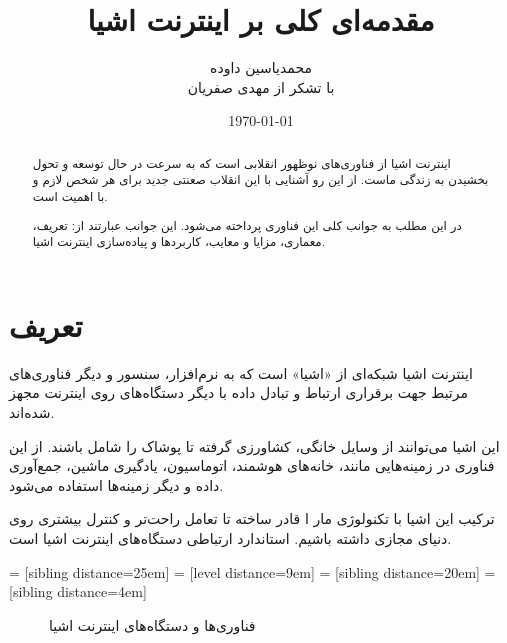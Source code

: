 \documentclass[a4paper, margin=1in]{article}
\author{محمدیاسین داوده\\
  \small{با تشکر از مهدی صفریان}}
\title{مقدمه‌ای کلی بر اینترنت اشیا}
\date{\today}
\begin{document}
\begin{titlingpage}
\maketitle

\begin{abstract}
  اینترنت اشیا از فناوری‌های نوظهور انقلابی است که به سرعت در حال توسعه و تحول بخشیدن به زندگی ماست.
  از این رو آشنایی با این انقلاب صعنتی جدید برای هر شخص لازم و با اهمیت است.

  در این مطلب به جوانب کلی این فناوری پرداخته می‌شود. این جوانب عبارتند از: تعریف، معماری، مزایا و معایب، کاربردها و پیاده‌سازی اینترنت اشیا.
\end{abstract}

\tableofcontents
\end{titlingpage}

\section{تعریف}
اینترنت اشیا شبکه‌ای از «اشیا» است که به نرم‌افزار، سنسور و دیگر فناوری‌های
مرتبط جهت برقراری ارتباط و تبادل داده با دیگر دستگاه‌های روی اینترنت مجهز شده‌اند.

این اشیا می‌توانند از وسایل خانگی، کشاورزی گرفته تا پوشاک را شامل باشند. از این فناوری در زمینه‌هایی مانند، خانه‌های هوشمند، اتوماسیون، یادگیری ماشین، جمع‌آوری داده و دیگر زمینه‌ها استفاده می‌شود.\cite{wp:iot}

ترکیب این اشیا با تکنولوژی مار ا قادر ساخته تا تعامل راحت‌تر و کنترل بیشتری روی دنیای مجازی داشته باشیم.
استاندارد ارتباطی دستگاه‌های اینترنت اشیا  است.\cite{javat}

 = [sibling distance=25em]
 = [level distance=9em]
 = [sibling distance=20em]
 = [sibling distance=4em]
\begin{figure}[ht]\centering
{}
\caption{فناوری‌ها و دستگاه‌های اینترنت اشیا}
\end{figure}
\end{document}
